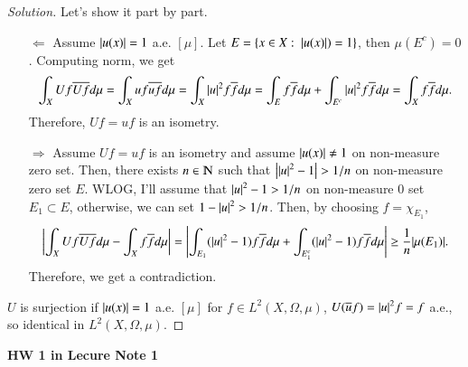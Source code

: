 \documentclass[a4paper, 12pt]{article}
\theoremstyle{Mydefinition}
\theoremstyle{Mytheorem}
\begin{document}
\begin{proof}[Solution]
Let's show it part by part.
\begin{enumerate}
    \item[$\Leftarrow$] Assume $\abs{u(x)} = 1$ a.e. $[\mu]$. Let $E = \{x\in X:~\abs{u(x)})=1\}$, then $\mu(E^c) = 0$. Computing norm, we get
    \begin{equation}
        \int_X Uf\overline{Uf}d\mu = \int_X uf\overline{uf}d\mu = \int_X \abs{u}^2 f\overline{f}d\mu = \int_E f\overline{f}d\mu + \int_{E^c} \abs{u}^2 f\overline{f}d\mu = \int_X f\overline{f}d\mu.
    \end{equation}
    Therefore, $Uf = uf$ is an isometry.
    \item[$\Rightarrow$] Assume $Uf = uf$ is an isometry and assume $\abs{u(x)}\neq 1$ on non-measure zero set. Then, there exists $n\in \varmathbb{N}$ such that $\abs{\abs{u}^2-1}>1/n$ on non-measure zero set $E$. WLOG, I'll assume that $\abs{u}^2-1>1/n$ on non-measure 0 set $E_1\subset E$, otherwise, we can set $1-\abs{u}^2 > 1/n$. Then, by choosing $f=\chi_{E_1}$,
    \begin{equation}
        \abs{\int_X Uf\overline{Uf}d\mu - \int_X f\overline{f}d\mu} = \abs{\int_{E_1} (\abs{u}^2-1)f\overline{f}d\mu + \int_{E_1^c} (\abs{u}^2-1)f\overline{f}d\mu}\geq \frac{1}{n}\abs{\mu(E_1)}.
    \end{equation}
    Therefore, we get a contradiction.
\end{enumerate}
$U$ is surjection if $\abs{u(x)} = 1$ a.e. $[\mu]$ for $f\in L^2(X,\Omega,\mu)$, $U(\overline{u}f) = \abs{u}^2f = f$ a.e., so identical in $L^2(X,\Omega,\mu)$.
\end{proof}

\noindent \textbf{HW 1 in Lecure Note 1}
\end{document}
